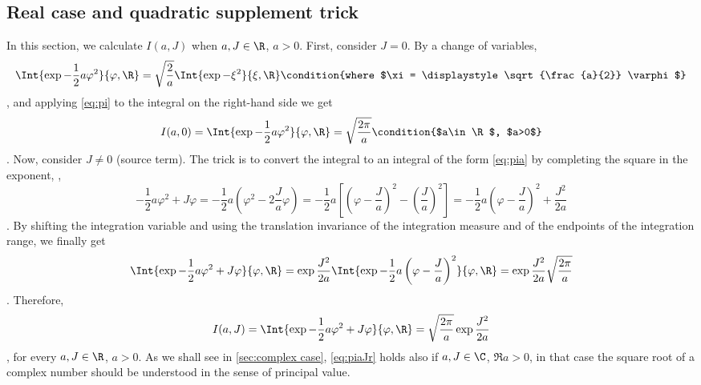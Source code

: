 \subsection{Real case and quadratic supplement trick}
\label{sec:real case}

In this section, we calculate $I(a,J)$ when $a,J\in\R$, $a>0$. First, 
consider
$J=0$. By a change of variables,
\begin{dmath*}[compact]
   \Int{\exp{-\frac{1}{2} a\varphi^{2}}}{\varphi, \R} = 
   \sqrt{\frac{2}{a}} 
   \Int{\exp{-\xi ^{2}} }{\xi, \R}
   \condition{where $\xi = \displaystyle \sqrt{\frac{a}{2}} \varphi $}
\end{dmath*},
and applying \cref{eq:pi} to the integral on the right-hand side we get 
\begin{dmath}[label={pia},compact]
   I(a,0) =  \Int{\exp{-\frac{1}{2} a\varphi^{2}}}{\varphi, \R} = 
   \sqrt{\frac{2\pi}{a}} 
   \condition{$a\in\R$, $a>0$}
\end{dmath}.
Now, consider $J\neq 0$ (source term).
The trick is to convert the integral to an integral of the form \cref{eq:pia} by 
completing the square in the exponent, \ie,
\begin{dmath*}[compact]
   -\frac{1}{2}a\varphi^{2} + J\varphi =  - \frac{1}{2} a \left( \varphi^{2} - 2 \frac{J}{a} \varphi \right)
=
-\frac{1}{2}a \left[ \left( \varphi - \frac{J}{a}\right)^{2} -
\left(\frac{J}{a}\right)^{2}\right] 
= -\frac{1}{2} a \left( \varphi - \frac{J}{a} \right)^{2} + \frac{J^{2}}{2a} 
\end{dmath*}.
By shifting the integration variable and using the translation invariance
of the integration measure and of the endpoints of the integration range, we
finally get
\begin{dmath*}[compact]
   \Int{\exp{-\frac{1}{2}a\varphi^{2} + J\varphi }}{\varphi, \R} =
   \exp{\frac{J^{2}}{2a}} \Int{\exp{-\frac{1}{2}a \left( \varphi -
	    \frac{J}{a}\right)^{2}}} {\varphi, \R}
   = \exp{ \frac{J^{2}}{2a}} \sqrt{\frac{2\pi}{a}} 
\end{dmath*}.
Therefore, 
\begin{dmath}[label={piaJr}, compact]
   I(a,J) = \Int{\exp{-\frac{1}{2}a\varphi^{2}+J\varphi }}{\varphi,\R} =
   \sqrt{\frac{2\pi}{a}}
   \exp{\frac{J^{2}}{2a}} 
\end{dmath},
for every $a,J\in\R$, $a>0$.
As we shall see in \cref{sec:complex case}, \cref{eq:piaJr} holds
also if
$a,J\in\C$, $\Re a>0$, in that case
the square root of a complex number should be
   understood in the sense of principal value. 

